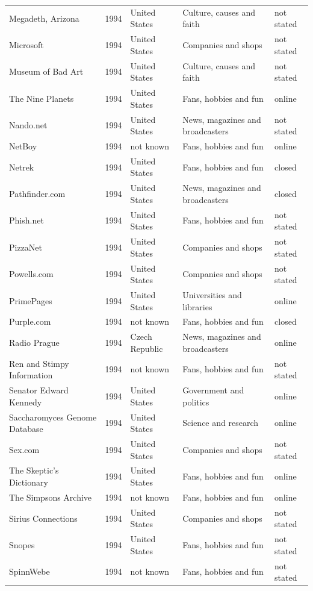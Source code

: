 \documentclass[11pt,a4paper]{article}
\begin{document}
\begin{footnotesize}
\begin{longtable}{p{4.6cm}rp{2.8cm}p{4.3cm}l}
Megadeth, Arizona & 1994 & United States & Culture, causes and faith & not stated\\
Microsoft & 1994 & United States & Companies and shops & not stated\\
Museum of Bad Art & 1994 & United States & Culture, causes and faith & not stated\\
The Nine Planets & 1994 & United States & Fans, hobbies and fun & online\\
Nando.net & 1994 & United States & News, magazines and broadcasters & not stated\\
NetBoy & 1994 & not known & Fans, hobbies and fun & online\\
Netrek & 1994 & United States & Fans, hobbies and fun & closed\\
Pathfinder.com & 1994 & United States & News, magazines and broadcasters & closed\\
Phish.net & 1994 & United States & Fans, hobbies and fun & not stated\\
PizzaNet & 1994 & United States & Companies and shops & not stated\\
Powells.com & 1994 & United States & Companies and shops & not stated\\
PrimePages & 1994 & United States & Universities and libraries & online\\
Purple.com & 1994 & not known & Fans, hobbies and fun & closed\\
Radio Prague & 1994 & Czech Republic & News, magazines and broadcasters & online\\
Ren and Stimpy Information & 1994 & not known & Fans, hobbies and fun & not stated\\
Senator Edward Kennedy & 1994 & United States & Government and politics & online\\
Saccharomyces Genome Database & 1994 & United States & Science and research & online\\
Sex.com & 1994 & United States & Companies and shops & not stated\\
The Skeptic's Dictionary & 1994 & United States & Fans, hobbies and fun & online\\
The Simpsons Archive & 1994 & not known & Fans, hobbies and fun & online\\
Sirius Connections & 1994 & United States & Companies and shops & not stated\\
Snopes & 1994 & United States & Fans, hobbies and fun & not stated\\
SpinnWebe & 1994 & not known & Fans, hobbies and fun & not stated\\

\end{longtable}
\end{footnotesize}
\end{document}
